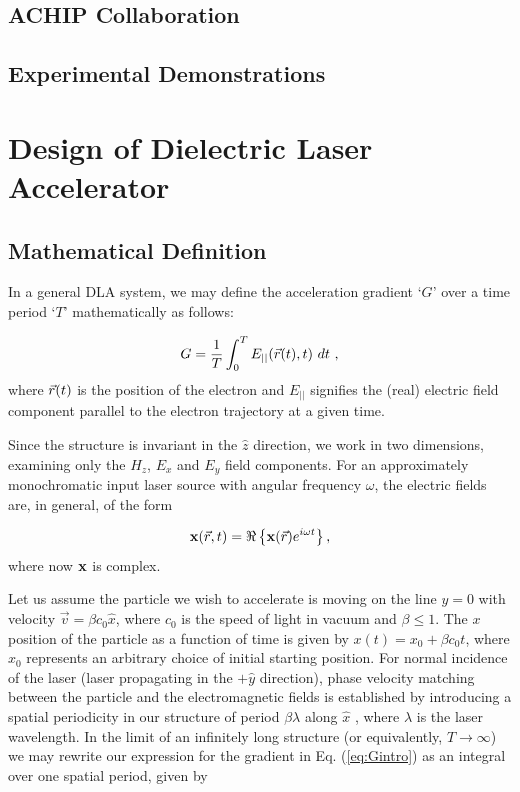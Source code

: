 \subsection{ACHIP Collaboration}
\subsection{Experimental Demonstrations}

\section{Design of Dielectric Laser Accelerator}

\subsection{Mathematical Definition}

In a general DLA system, we may define the acceleration gradient `$G$' over a time period `$T$' mathematically as follows:

\begin{equation}
G = \frac{1}{T}\int_0^{T}{ E_{||}(\vec{r}(t),t)\ dt}
\label{eq:Gintro}
\ ,
\end{equation} 
where $\vec{r}(t)$ is the position of the electron and $E_{||}$ signifies the (real) electric field component parallel to the electron trajectory at a given time.

Since the structure is invariant in the $\hat{z}$ direction, we work in two dimensions, examining only the $H_z$, $E_x$ and $E_y$ field components.
For an approximately monochromatic input laser source with angular frequency $\omega$, the electric fields are, in general, of the form


\begin{equation}
\mathbf{x}(\vec{r},t) =  \Re \left\{ \mathbf{x}(\vec{r})e^{i\omega t} \right\} ,
\end{equation}
where now $\mathbf{x}$ is complex.

Let us assume the particle we wish to accelerate is moving on the line $y=0$ with velocity $\vec{v} = \beta c_0 \hat{x}$, where $c_0$ is the speed of light in vacuum and $\beta \leq 1$.
The $x$ position of the particle as a function of time is given by $x(t) = x_0 + \beta c_0 t$, where $x_0$ represents an arbitrary choice of initial starting position.
For normal incidence of the laser (laser propagating in the $+\hat{y}$ direction), phase velocity matching between the particle and the electromagnetic fields is established by introducing a spatial periodicity in our structure of period $\beta \lambda$ along $\hat{x}$ , where $\lambda$ is the laser wavelength.
In the limit of an infinitely long structure (or equivalently, $T \to \infty $) we may rewrite our expression for the gradient in Eq. (\ref{eq:Gintro}) as an integral over one spatial period, given by

